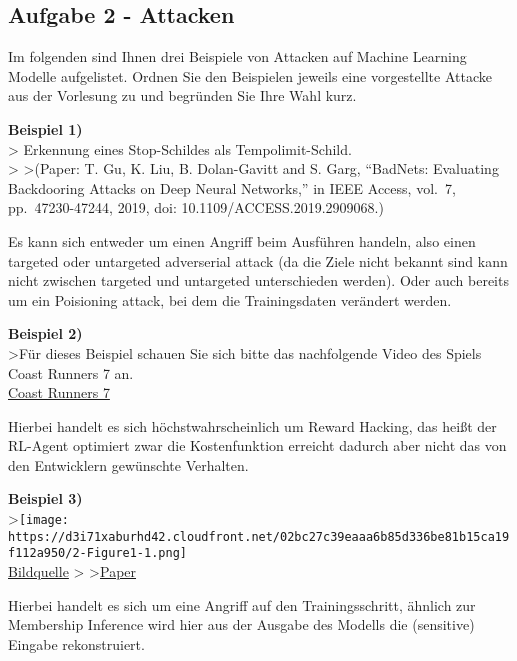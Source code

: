 \documentclass[11pt]{article}
\begin{document}
    \hypertarget{aufgabe-2---attacken}{%
\subsection{Aufgabe 2 - Attacken}\label{aufgabe-2---attacken}}

Im folgenden sind Ihnen drei Beispiele von Attacken auf Machine Learning
Modelle aufgelistet. Ordnen Sie den Beispielen jeweils eine vorgestellte
Attacke aus der Vorlesung zu und begründen Sie Ihre Wahl kurz.

\textbf{Beispiel 1)}\\
\textgreater{} Erkennung eines Stop-Schildes als Tempolimit-Schild.\\
\textgreater{} \textgreater{}(Paper: T. Gu, K. Liu, B. Dolan-Gavitt and
S. Garg, ``BadNets: Evaluating Backdooring Attacks on Deep Neural
Networks,'' in IEEE Access, vol.~7, pp.~47230-47244, 2019, doi:
10.1109/ACCESS.2019.2909068.)

Es kann sich entweder um einen Angriff beim Ausführen handeln, also
einen targeted oder untargeted adverserial attack (da die Ziele nicht
bekannt sind kann nicht zwischen targeted und untargeted unterschieden
werden). Oder auch bereits um ein Poisioning attack, bei dem die
Trainingsdaten verändert werden.

\textbf{Beispiel 2)}\\
\textgreater{}Für dieses Beispiel schauen Sie sich bitte das
nachfolgende Video des Spiels Coast Runners 7 an.\\
\href{https://www.youtube.com/watch?time_continue=1\&v=tlOIHko8ySg}{Coast
Runners 7}

Hierbei handelt es sich höchstwahrscheinlich um Reward Hacking, das
heißt der RL-Agent optimiert zwar die Kostenfunktion erreicht dadurch
aber nicht das von den Entwicklern gewünschte Verhalten.

\textbf{Beispiel 3)}\\
\textgreater{}\texttt{[image: https://d3i71xaburhd42.cloudfront.net/02bc27c39eaaa6b85d336be81b15ca19f112a950/2-Figure1-1.png]}\\
\href{https://d3i71xaburhd42.cloudfront.net/02bc27c39eaaa6b85d336be81b15ca19f112a950/2-Figure1-1.png}{Bildquelle}
\textgreater{}
\textgreater{}\href{https://dl.acm.org/doi/pdf/10.1145/2810103.2813677}{Paper}

Hierbei handelt es sich um eine Angriff auf den Trainingsschritt,
ähnlich zur Membership Inference wird hier aus der Ausgabe des Modells
die (sensitive) Eingabe rekonstruiert.
\end{document}
